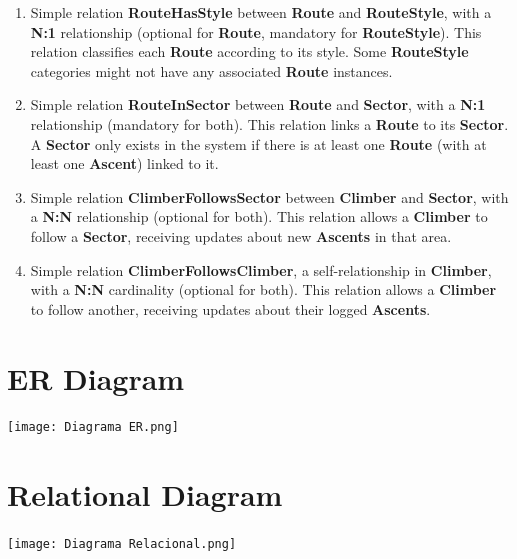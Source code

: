 \documentclass[12pt, a4paper]{article}
\begin{document}
\begin{enumerate}
    \item Simple relation \textbf{RouteHasStyle} between \textbf{Route} and \textbf{RouteStyle}, with a \textbf{N:1} relationship (optional for \textbf{Route}, mandatory for \textbf{RouteStyle}).  
    This relation classifies each \textbf{Route} according to its style.  
    Some \textbf{RouteStyle} categories might not have any associated \textbf{Route} instances.

    \item Simple relation \textbf{RouteInSector} between \textbf{Route} and \textbf{Sector}, with a \textbf{N:1} relationship (mandatory for both).  
    This relation links a \textbf{Route} to its \textbf{Sector}.  
    A \textbf{Sector} only exists in the system if there is at least one \textbf{Route} (with at least one \textbf{Ascent}) linked to it.

    \item Simple relation \textbf{ClimberFollowsSector} between \textbf{Climber} and \textbf{Sector}, with a \textbf{N:N} relationship (optional for both).  
    This relation allows a \textbf{Climber} to follow a \textbf{Sector}, receiving updates about new \textbf{Ascents} in that area.

    \item Simple relation \textbf{ClimberFollowsClimber}, a self-relationship in \textbf{Climber}, with a \textbf{N:N} cardinality (optional for both).  
    This relation allows a \textbf{Climber} to follow another, receiving updates about their logged \textbf{Ascents}.
\end{enumerate}

\section{ER Diagram}

\begin{center}
    \texttt{[image: Diagrama ER.png]}
\end{center}

\section{Relational Diagram}

\begin{center}
    \texttt{[image: Diagrama Relacional.png]}
\end{center}
\end{document}
